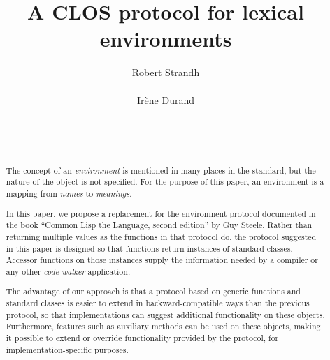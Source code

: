 \documentclass{acm_proc_article-sp}
\begin{document}
\title{A CLOS protocol for lexical environments}
\author{
  \alignauthor
Robert Strandh\\
\\
\alignauthor
Irène Durand\\
\\
\\
\\
}


\maketitle

\begin{abstract}
The concept of an \emph{environment} is mentioned in many places in
the \commonlisp{} standard, but the nature of the object is not
specified.  For the purpose of this paper, an environment is a mapping
from \emph{names} to \emph{meanings}.

In this paper, we propose a replacement for the environment protocol
documented in the book ``Common Lisp the Language, second edition'' by
Guy Steele.  Rather than returning multiple values as the functions in
that protocol do, the protocol suggested in this paper is designed so
that functions return instances of standard classes.  Accessor
functions on those instances supply the information needed by a
compiler or any other \emph{code walker} application.

The advantage of our approach is that a protocol based on generic
functions and standard classes is easier to extend in
backward-compatible ways than the previous protocol, so that
implementations can suggest additional functionality on these objects.
Furthermore, \clos{} features such as auxiliary methods can be used on
these objects, making it possible to extend or override functionality
provided by the protocol, for implementation-specific purposes.
\end{abstract}
\end{document}
